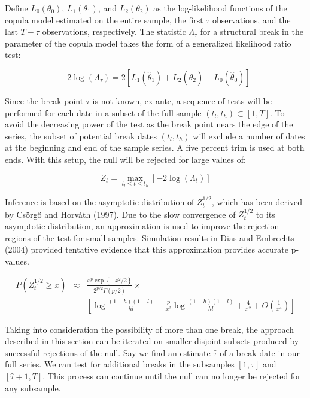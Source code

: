 \documentclass[12pt]{article}
\begin{document}
Define $L_{0}\left(\theta_{0}\right)$, $L_{1}\left(\theta_{1}\right)$, and $L_{2}\left(\theta_{2}\right)$ as the log-likelihood functions of the copula model estimated on the entire sample, the first $\tau$ observations, and the last $T-\tau$ observations, respectively. The statistic $\Lambda_{\tau}$ for a structural break in the parameter of the copula model takes the form of a generalized likelihood ratio test:

\begin{equation}
-2\log \left(\Lambda_{\tau}\right) = 2\left[L_{1}\left(\hat{\theta}_{1}\right) + L_{2}\left(\hat{\theta}_{2}\right) - L_{0}\left(\hat{\theta}_{0}\right)\right]
\end{equation}

Since the break point $\tau$ is not known, ex ante, a sequence of tests will be performed for each date in a subset of the full sample $\left(t_{l},t_{h}\right) \subset \left[1, T\right]$. To avoid the decreasing power of the test as the break point nears the edge of the series, the subset of potential break dates $\left( t_{l},t_{h}\right)$ will exclude a number of dates at the beginning and end of the sample series. A five percent trim is used at both ends. With this setup, the null will be rejected for large values of:

\begin{equation}
Z_{t}=\max_{t_{l}\leq t\leq t_{h}}\left[ -2\log \left( \Lambda _{t}\right)\right]
\end{equation}

Inference is based on the asymptotic distribution of $Z_{t}^{1/2}$, which has been derived by Cs\"{o}rg\H{o} and Horv\'{a}th (1997). Due to the slow convergence of $Z_{t}^{1/2}$ to its asymptotic distribution, an approximation is used to improve the rejection regions of the test for small samples. Simulation results in Dias and Embrechts (2004) provided tentative evidence that this approximation provides accurate p-values.

\begin{eqnarray}
P\left(Z_{t}^{1/2} \geq x\right) &\approx& \frac{x^{p} \exp\left\{-x^{2}/2\right\}}{2^{p/2}\Gamma \left(p/2\right)} \times  \\
                                 && \left[\log \frac{\left(1-h\right) \left(1-l\right)}{hl} - \frac{p}{x^{2}}\log \frac{\left(1-h\right)\left(1-l\right)}{hl} + \frac{4}{x^{2}} + O \left(\frac{1}{x^{4}}\right)\right]
\end{eqnarray}

Taking into consideration the possibility of more than one break, the approach described in this section can be iterated on smaller disjoint subsets produced by successful rejections of the null. Say we find an estimate $\hat{\tau}$ of a break date in our full series. We can test for additional breaks in the subsamples $\left[1, \hat{\tau}\right]$ and $\left[\hat{\tau} + 1, T\right]$. This process can continue until the null can no longer be rejected for any subsample.
\end{document}
